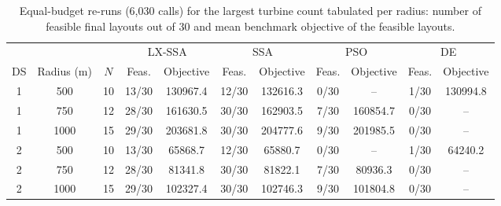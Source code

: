 \begin{table}[!t]
\centering
\caption{Equal-budget re-runs (6,030 calls) for the largest turbine count tabulated per radius: number of feasible final layouts out of 30 and mean benchmark objective of the feasible layouts.}
\label{tab:crowded}
\footnotesize\setlength{\tabcolsep}{4pt}
\begin{tabular}{ccccccccccc}
\toprule
& & & \multicolumn{2}{c}{LX-SSA} & \multicolumn{2}{c}{SSA} & \multicolumn{2}{c}{PSO} & \multicolumn{2}{c}{DE} \\
\cmidrule(lr){4-5}\cmidrule(lr){6-7}\cmidrule(lr){8-9}\cmidrule(lr){10-11}
DS & Radius (m) & $N$ & Feas. & Objective & Feas. & Objective & Feas. & Objective & Feas. & Objective \\
\midrule
1 & 500 & 10 & 13/30 & 130967.4 & 12/30 & 132616.3 & 0/30 & -- & 1/30 & 130994.8 \\
1 & 750 & 12 & 28/30 & 161630.5 & 30/30 & 162903.5 & 7/30 & 160854.7 & 0/30 & -- \\
1 & 1000 & 15 & 29/30 & 203681.8 & 30/30 & 204777.6 & 9/30 & 201985.5 & 0/30 & -- \\
2 & 500 & 10 & 13/30 & 65868.7 & 12/30 & 65880.7 & 0/30 & -- & 1/30 & 64240.2 \\
2 & 750 & 12 & 28/30 & 81341.8 & 30/30 & 81822.1 & 7/30 & 80936.3 & 0/30 & -- \\
2 & 1000 & 15 & 29/30 & 102327.4 & 30/30 & 102746.3 & 9/30 & 101804.8 & 0/30 & -- \\
\bottomrule
\end{tabular}
\end{table}

